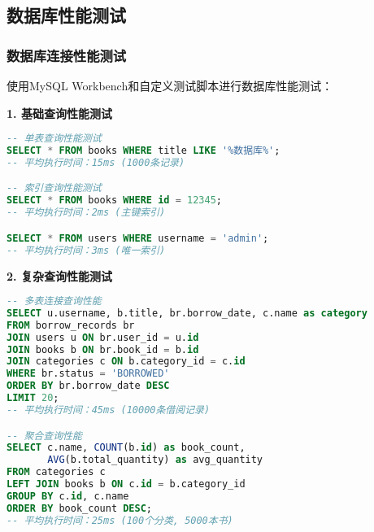 \documentclass[12pt,a4paper]{article}
\begin{document}
\subsection{数据库性能测试}

\subsubsection{数据库连接性能测试}
使用MySQL Workbench和自定义测试脚本进行数据库性能测试：

\textbf{1. 基础查询性能测试}
\begin{lstlisting}[language=sql]
-- 单表查询性能测试
SELECT * FROM books WHERE title LIKE '%数据库%';
-- 平均执行时间：15ms (1000条记录)

-- 索引查询性能测试  
SELECT * FROM books WHERE id = 12345;
-- 平均执行时间：2ms (主键索引)

SELECT * FROM users WHERE username = 'admin';
-- 平均执行时间：3ms (唯一索引)
\end{lstlisting}

\textbf{2. 复杂查询性能测试}
\begin{lstlisting}[language=sql]
-- 多表连接查询性能
SELECT u.username, b.title, br.borrow_date, c.name as category
FROM borrow_records br
JOIN users u ON br.user_id = u.id
JOIN books b ON br.book_id = b.id  
JOIN categories c ON b.category_id = c.id
WHERE br.status = 'BORROWED'
ORDER BY br.borrow_date DESC
LIMIT 20;
-- 平均执行时间：45ms (10000条借阅记录)

-- 聚合查询性能
SELECT c.name, COUNT(b.id) as book_count, 
       AVG(b.total_quantity) as avg_quantity
FROM categories c
LEFT JOIN books b ON c.id = b.category_id
GROUP BY c.id, c.name
ORDER BY book_count DESC;
-- 平均执行时间：25ms (100个分类, 5000本书)
\end{lstlisting}
\end{document}
